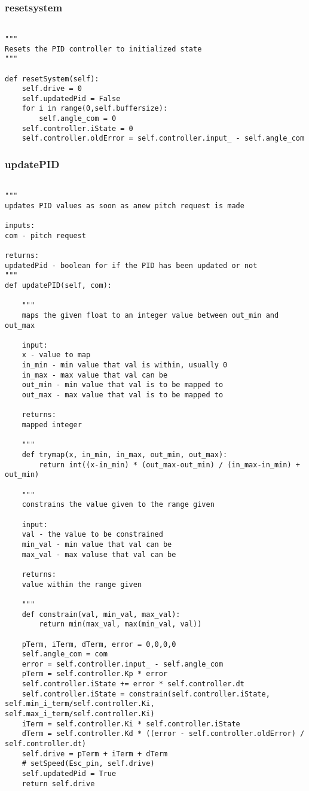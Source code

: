 \documentclass[11pt]{article}
\begin{document}
\subsubsection{resetsystem}
\label{sec:orgf35e29e}
\begin{verbatim}

"""
Resets the PID controller to initialized state
"""

def resetSystem(self):
    self.drive = 0
    self.updatedPid = False
    for i in range(0,self.buffersize):
        self.angle_com = 0
    self.controller.iState = 0
    self.controller.oldError = self.controller.input_ - self.angle_com
\end{verbatim}

\subsubsection{updatePID}
\label{sec:org8ece87e}
\begin{verbatim}

"""
updates PID values as soon as anew pitch request is made

inputs:
com - pitch request

returns:
updatedPid - boolean for if the PID has been updated or not
"""
def updatePID(self, com):

    """
    maps the given float to an integer value between out_min and out_max

    input:
    x - value to map
    in_min - min value that val is within, usually 0
    in_max - max value that val can be
    out_min - min value that val is to be mapped to
    out_max - max value that val is to be mapped to

    returns:
    mapped integer

    """
    def trymap(x, in_min, in_max, out_min, out_max):
        return int((x-in_min) * (out_max-out_min) / (in_max-in_min) + out_min)

    """
    constrains the value given to the range given

    input:
    val - the value to be constrained
    min_val - min value that val can be
    max_val - max valuse that val can be

    returns:
    value within the range given

    """
    def constrain(val, min_val, max_val):
        return min(max_val, max(min_val, val))

    pTerm, iTerm, dTerm, error = 0,0,0,0
    self.angle_com = com
    error = self.controller.input_ - self.angle_com
    pTerm = self.controller.Kp * error
    self.controller.iState += error * self.controller.dt
    self.controller.iState = constrain(self.controller.iState, self.min_i_term/self.controller.Ki, self.max_i_term/self.controller.Ki)
    iTerm = self.controller.Ki * self.controller.iState
    dTerm = self.controller.Kd * ((error - self.controller.oldError) / self.controller.dt)
    self.drive = pTerm + iTerm + dTerm
    # setSpeed(Esc_pin, self.drive)
    self.updatedPid = True
    return self.drive
\end{verbatim}
\end{document}
